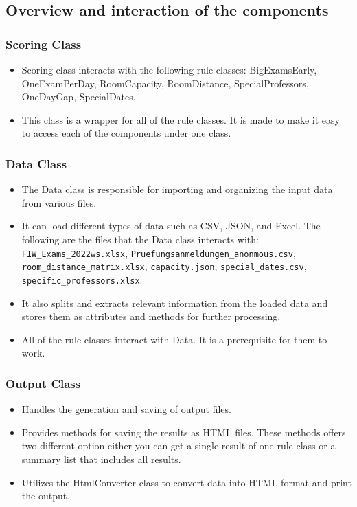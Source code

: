 \subsection{Overview and interaction of the components}


\subsubsection{Scoring Class}


\begin{itemize}
\item Scoring class interacts with the following rule classes: BigExamsEarly, OneExamPerDay, RoomCapacity, RoomDistance, SpecialProfessors, OneDayGap, SpecialDates.
\item This class is a wrapper for all of the rule classes. It is made to make it easy to access each of the components under one class.
\end{itemize}


\subsubsection{Data Class}


\begin{itemize}
\item The Data class is responsible for importing and organizing the input data from various files.
\item It can load different types of data such as CSV, JSON, and Excel. The following are the files that the Data class interacts with: \texttt{FIW\_Exams\_2022ws.xlsx}, \texttt{Pruefungsanmeldungen\_anonmous.csv}, \texttt{room\_distance\_matrix.xlsx}, \texttt{capacity.json}, \texttt{special\_dates.csv}, \texttt{specific\_professors.xlsx}.
\item It also splits and extracts relevant information from the loaded data and stores them as attributes and methods for further processing.
\item All of the rule classes interact with Data. It is a prerequisite for them to work.
\end{itemize}


\subsubsection{Output Class}


\begin{itemize}
\item Handles the generation and saving of output files.
\item Provides methods for saving the results as HTML files. These methods offers two different option either you can get a single result of one rule class or a summary list that includes all results.
\item Utilizes the HtmlConverter class to convert data into HTML format and print the output.
\end{itemize}


